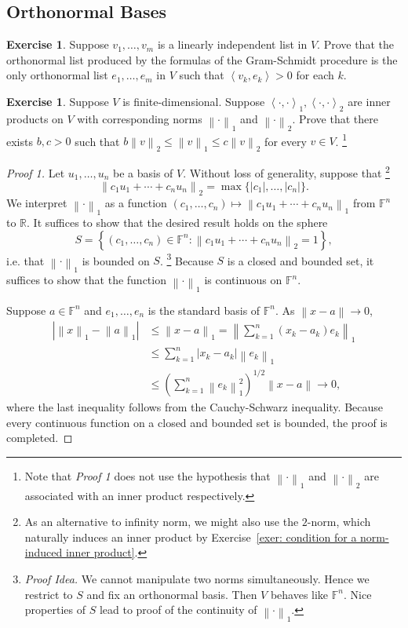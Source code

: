 \documentclass[colorlinks]{tufte-handout}
\theoremstyle{plain} %
\theoremstyle{definition}
\newtheorem{exer}[thm]{Exercise}
\theoremstyle{remark}
\def\idea{\textit{\color[rgb]{0,0,.55}Proof Idea. }}
\newcommand{\bra}[1]{\mathopen{}\left(#1\right)}
\newcommand{\cbra}[1]{\mathopen{}\left\{#1\right\}}
\newcommand{\norm}[1]{\mathopen{}\left\lVert#1\right\rVert}
\newcommand{\inp}[2]{\mathopen{}\left\langle#1,#2\right\rangle}
\newcommand{\abs}[1]{\mathopen{}\left|#1\right|}
\newcommand{\R}{\mathbb{R}}
\newcommand{\F}{\mathbb{F}}
\begin{document}
\subsection{Orthonormal Bases}
\begin{exer}
	Suppose $v_1,\dots,v_m$ is a linearly independent list in $V$. Prove that the orthonormal list produced by the formulas of the Gram-Schmidt procedure is the only orthonormal list $e_1,\dots,e_m$ in $V$ such that $\inp{v_k}{e_k}>0$ for each $k$.
\end{exer}

\begin{exer}
	Suppose $V$ is finite-dimensional. Suppose $\inp{\cdot}{\cdot}_1,\inp{\cdot}{\cdot}_2$ are inner products on $V$ with corresponding norms $\norm{\cdot}_1$ and $\norm{\cdot}_2$. Prove that there exists $b,c>0$ such that $b\norm{v}_2\leq\norm{v}_1\leq c\norm{v}_2$ for every $v\in V$.%
	\footnote{Note that \textit{Proof 1} does not use the hypothesis that $\norm{\cdot}_1$ and $\norm{\cdot}_2$ are associated with an inner product respectively.}
\end{exer}
\begin{proof}[Proof 1]
	Let $u_1,\dots,u_n$ be a basis of $V$. Without loss of generality, suppose that%
	\footnote{As an alternative to infinity norm, we might also use the $2$-norm, which naturally induces an inner product by Exercise~\ref{exer: condition for a norm-induced inner product}.}
	\[\norm{c_1u_1+\cdots+c_nu_n}_2=\max\{\abs{c_1},\dots,\abs{c_n}\}.\]
	We interpret $\norm{\cdot}_1$ as a function $(c_1,\dots,c_n)\mapsto\norm{c_1u_1+\cdots+c_nu_n}_1$ from $\F^n$ to $\R$. It suffices to show that the desired result holds on the sphere
	\[S=\cbra{(c_1,\dots,c_n)\in\F^n:\norm{c_1u_1+\cdots+c_nu_n}_2=1},\]
	i.e. that $\norm{\cdot}_1$ is bounded on $S$.%
	\footnote{\idea We cannot manipulate two norms simultaneously. Hence we restrict to $S$ and fix an orthonormal basis. Then $V$ behaves like $\F^n$. Nice properties of $S$ lead to proof of the continuity of $\norm{\cdot}_1$.}
	Because $S$ is a closed and bounded set, it suffices to show that the function $\norm{\cdot}_1$ is continuous on $\F^n$.
	
	Suppose $a\in\F^n$ and $e_1,\dots,e_n$ is the standard basis of $\F^n$. As $\norm{x-a}\to0$,
	\begin{align*}
		\abs{\norm{x}_1-\norm{a}_1}&\leq\norm{x-a}_1=\norm{\sum_{k=1}^{n}(x_k-a_k)e_k}_1\\
		&\leq\sum_{k=1}^{n}\abs{x_k-a_k}\norm{e_k}_1\\
		&\leq\bra{\sum_{k=1}^{n}\norm{e_k}_1^2}^{1/2}\norm{x-a}\to0,
	\end{align*}
	where the last inequality follows from the Cauchy-Schwarz inequality. Because every continuous function on a closed and bounded set is bounded, the proof is completed.
\end{proof}
\end{document}
